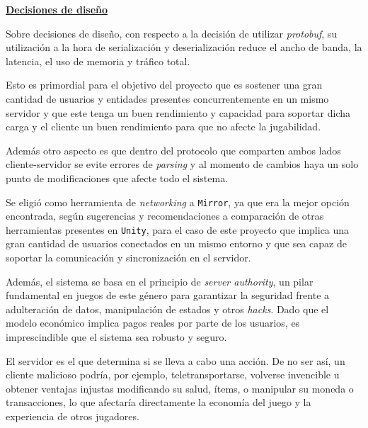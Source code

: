 \vspace{0.35cm}

\textbf{\underline{Decisiones de diseño}}

\vspace{0.15cm}

Sobre decisiones de diseño, con respecto a la decisión de utilizar \textit{protobuf}, su utilización a la hora 
de serialización y deserialización reduce el ancho de banda, la latencia, el uso de memoria y tráfico total.

Esto es primordial para el objetivo del proyecto que es sostener una gran cantidad de usuarios y entidades 
presentes concurrentemente en un mismo servidor y que este tenga un buen rendimiento y capacidad para soportar 
dicha carga y el cliente un buen rendimiento para que no afecte la jugabilidad.

Además otro aspecto es que dentro del protocolo que comparten ambos lados cliente-servidor se evite errores de 
\textit{parsing} y al momento de cambios haya un solo punto de modificaciones que afecte todo el sistema.

\vspace{0.25cm}

Se eligió como herramienta de \textit{networking} a \texttt{Mirror}, ya que era la mejor opción encontrada, según sugerencias 
y recomendaciones a comparación de otras herramientas presentes en \texttt{Unity}, 
para el caso de este proyecto que implica una gran cantidad de usuarios conectados en un mismo entorno y 
que sea capaz de soportar la comunicación y sincronización en el servidor.

Además, el sistema se basa en el principio de \textit{server authority}, un pilar fundamental en juegos de este 
género para garantizar la seguridad frente a adulteración de datos, manipulación de estados y otros \textit{hacks}. 
Dado que el modelo económico implica pagos reales por parte de los usuarios, es imprescindible que el sistema sea 
robusto y seguro.

El servidor es el que determina si se lleva a cabo una acción. De no ser así, un cliente 
malicioso podría, por ejemplo, teletransportarse, volverse invencible u obtener ventajas injustas modificando su salud, 
ítems, o manipular su moneda o transacciones, lo que afectaría directamente la economía del juego y la experiencia de otros 
jugadores.
